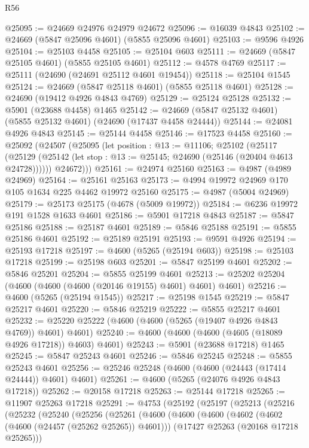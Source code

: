 \begin{lexlean}{R56}
\begin{coremodule}
@25095 := @24669 @24976 @24979 @24672
@25096 := @16039 @4843
@25102 := @24669 (@5847 @25096 @4601) (@5855 @25096 @4601)
@25103 := @9596 @4926
@25104 := @25103 @4458
@25105 := @25104 @603
@25111 := @24669 (@5847 @25105 @4601) (@5855 @25105 @4601)
@25112 := @4578 @4769
@25117 := @25111 (@24690 (@24691 @25112 @4601 @19454))
@25118 := @25104 @1545
@25124 := @24669 (@5847 @25118 @4601) (@5855 @25118 @4601)
@25128 := @24690 (@19412 @4926 @4843 @4769)
@25129 := @25124 @25128
@25132 := @5901 (@23688 @4458) @1465
@25142 := @24669 (@5847 @25132 @4601) (@5855 @25132 @4601) (@24690 (@17437 @4458 @24444))
@25144 := @24081 @4926 @4843
@25145 := @25144 @4458
@25146 := @17523 @4458
@25160 := @25092
    (@24507
      (@25095
        (let position : @13 := @11106;
        @25102
          (@25117
            (@25129 (@25142 (let stop : @13 := @25145; @24690 (@25146 (@20404 @4613 @24728))))))
          @24672)))
@25161 := @24974 @25160
@25163 := @4987 (@4989 @24969)
@25164 := @25161 @25163
@25173 := @4994 @19972 @24969 @170 @105 @1634 @225 @4462 @19972 @25160
@25175 := @4987 (@5004 @24969)
@25179 := @25173 @25175 (@4678 (@5009 @19972))
@25184 := @6236 @19972 @191 @1528 @1633 @4601
@25186 := @5901 @17218 @4843
@25187 := @5847 @25186
@25188 := @25187 @4601
@25189 := @5846 @25188
@25191 := @5855 @25186 @4601
@25192 := @25189 @25191
@25193 := @9591 @4926
@25194 := @25193 @17218
@25197 := @4600 (@5265 (@25194 @603))
@25198 := @25103 @17218
@25199 := @25198 @603
@25201 := @5847 @25199 @4601
@25202 := @5846 @25201
@25204 := @5855 @25199 @4601
@25213 := @25202 @25204 (@4600 (@4600 (@4600 (@20146 @19155) @4601) @4601) @4601)
@25216 := @4600 (@5265 (@25194 @1545))
@25217 := @25198 @1545
@25219 := @5847 @25217 @4601
@25220 := @5846 @25219
@25222 := @5855 @25217 @4601
@25232 := @25220 @25222 (@4600 (@4600 (@5265 (@19407 @4926 @4843 @4769)) @4601) @4601)
@25240 := @4600 (@4600 (@4600 (@4605 (@18089 @4926 @17218)) @4603) @4601)
@25243 := @5901 (@23688 @17218) @1465
@25245 := @5847 @25243 @4601
@25246 := @5846 @25245
@25248 := @5855 @25243 @4601
@25256 := @25246 @25248 (@4600 (@4600 (@24443 (@17414 @24444)) @4601) @4601)
@25261 := @4600 (@5265 (@24076 @4926 @4843 @17218))
@25262 := @20158 @17218
@25263 := @25144 @17218
@25265 := @11907 @25263 @17218
@25291 := @4753
    (@25192
      (@25197
        (@25213
          (@25216
            (@25232
              (@25240
                (@25256
                  (@25261
                    (@4600
                      (@4600
                        (@4600
                          (@4602 (@4602 (@4600 (@24457 (@25262 @25265)) @4601)))
                          (@17427 @25263 (@20168 @17218 @25265)))

\end{coremodule}
\end{lexlean}
